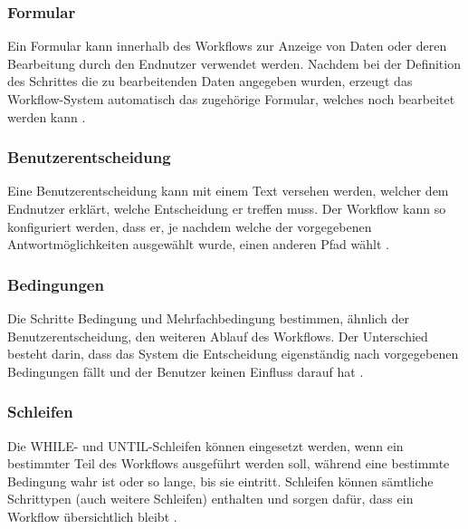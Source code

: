 \subsubsection{Formular}
Ein Formular kann innerhalb des Workflows zur Anzeige von Daten oder deren Bearbeitung durch den Endnutzer verwendet werden. Nachdem bei der Definition des Schrittes die zu bearbeitenden Daten angegeben wurden, erzeugt das Workflow-System automatisch das zugehörige Formular, welches noch bearbeitet werden kann \cite{SAPHelpWf}. 

\subsubsection{Benutzerentscheidung}
Eine Benutzerentscheidung kann mit einem Text versehen werden, welcher dem Endnutzer erklärt, welche Entscheidung er treffen muss. Der Workflow kann so konfiguriert werden, dass er, je nachdem welche der vorgegebenen Antwortmöglichkeiten ausgewählt wurde, einen anderen Pfad wählt \cite{SAPHelpWf}.

\subsubsection{Bedingungen}
Die Schritte Bedingung und Mehrfachbedingung bestimmen, ähnlich der Benutzerentscheidung, den weiteren Ablauf des Workflows. Der Unterschied besteht darin, dass das System die Entscheidung eigenständig nach vorgegebenen Bedingungen fällt und der Benutzer keinen Einfluss darauf hat \cite{SAPHelpWf}.

\subsubsection{Schleifen}
Die WHILE- und UNTIL-Schleifen können eingesetzt werden, wenn ein bestimmter Teil des Workflows ausgeführt werden soll, während eine bestimmte Bedingung wahr ist oder so lange, bis sie eintritt. Schleifen können sämtliche Schrittypen (auch weitere Schleifen) enthalten und sorgen dafür, dass ein Workflow übersichtlich bleibt \cite{SAPHelpWf}.

